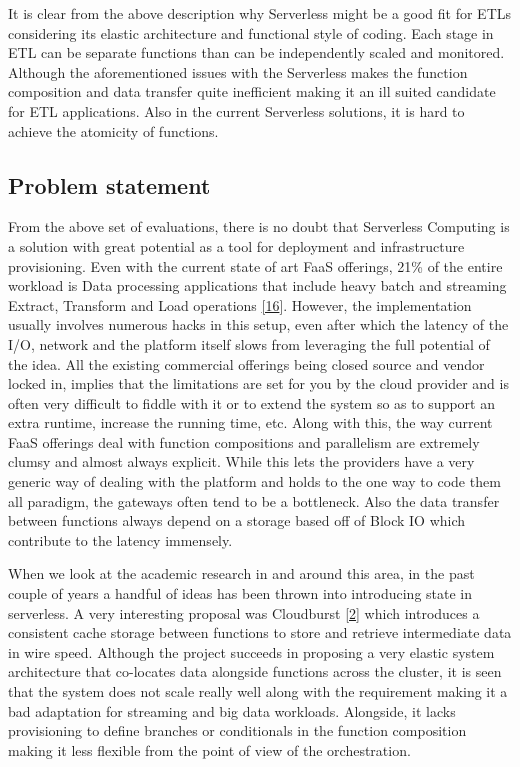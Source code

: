 \documentclass[12pt,titlepage]{article}
\begin{document}
It is clear from the above description why Serverless might be a good fit for
ETLs considering its elastic architecture and functional style of coding. Each
stage in ETL can be separate functions than can be independently scaled and
monitored. Although the aforementioned issues with the Serverless makes the
function composition and data transfer quite inefficient making it an ill suited
candidate for ETL applications. Also in the current Serverless solutions, it is
hard to achieve the atomicity of functions.

\subsection{Problem statement}
\label{sec:org103f384}
From the above set of evaluations, there is no doubt that Serverless Computing is a
solution with great potential as a tool for deployment and infrastructure provisioning. Even with the current
state of art FaaS offerings, 21\% of the entire workload is Data processing
applications that include heavy batch and streaming Extract, Transform and Load
operations \hyperref[ref:16]{[16}]. However, the implementation usually involves
numerous hacks in this setup, even after which the latency of the I/O, network
and the platform itself slows from leveraging the full potential of the idea.
All the existing commercial offerings being closed source and vendor locked in,
implies that the limitations are set for you by
the cloud provider and is often very difficult to fiddle with it or to extend
the system so as to support an extra runtime, increase the running time, etc.
Along with this, the way current FaaS offerings deal with function compositions
and parallelism are extremely clumsy and almost always explicit. While this lets
the providers have a very generic way of dealing with the platform and holds to
the one way to code them all paradigm, the gateways often tend to be a
bottleneck. Also the data transfer between functions always depend on a storage
based off of Block IO which contribute to the latency immensely.

When we look at the academic research in and around this area, in the past
couple of years a handful of ideas has been thrown into introducing state in
serverless. A very interesting proposal was Cloudburst \hyperref[ref:2]{[2}] which
introduces a consistent cache storage between functions to store and retrieve
intermediate data in wire speed. Although the project succeeds in proposing a
very elastic system architecture that co-locates data alongside functions across
the cluster, it is seen that the system does not scale really well along with
the requirement making it a bad adaptation for streaming and big data workloads.
Alongside, it lacks provisioning to define branches or conditionals in the function
composition making it less flexible from the point of view of the orchestration.
\end{document}
